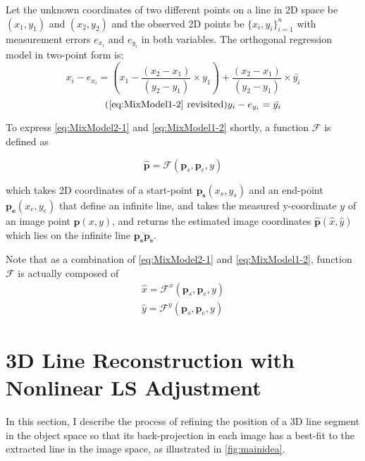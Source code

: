 Let the unknown coordinates of two different points on a line in 2D space be $(x_1,y_1)$ and $(x_2,y_2)$ and the observed 2D points be $\{x_i,y_i\}^n_{i=1}$ with measurement errors $e_{x_i}$ and $e_{y_i}$ in both variables. The orthogonal regression model in two-point form is: 
\begin{equation} \label{eq:MixModel2-1}
x_i - e_{x_i}= (x_1-\dfrac{(x_2-x_1)}{(y_2-y_1)}\times y_1) + \dfrac{(x_2-x_1)}{(y_2-y_1)}\times \bar{y_i}
\end{equation}
\begin{equation} \tag{\ref{eq:MixModel1-2} revisited}
y_i-e_{y_i} = \bar{y_i}
\end{equation}

To express \eqref{eq:MixModel2-1} and \eqref{eq:MixModel1-2} shortly, a function $\mathcal{F}$ is defined as

\begin{equation} \label{eq:Ffunction}
\hat{\mathbf{p}} = \mathcal{F}(\mathbf{p}_s,\mathbf{p}_e,y)
\end{equation}

which takes 2D coordinates of a start-point $\mathbf{p_s}(x_s,y_s)$ and an end-point $\mathbf{p_e}(x_e,y_e)$ that define an infinite line, and takes the measured y-coordinate $y$ of an image point $\mathbf{p}(x,y)$, and returns the estimated image coordinates $\mathbf{\hat{p}}(\hat{x},\hat{y})$ which lies on the infinite line $\overline{\mathbf{p_s}\mathbf{p_s}}$.

Note that as a combination of \eqref{eq:MixModel2-1} and \eqref{eq:MixModel1-2}, function $\mathcal{F}$ is actually composed of
\begin{equation} \label{eq:Ffunction_xy}
\begin{split}
\hat{x} = \mathcal{F}^x(\mathbf{p}_s,\mathbf{p}_e,y)\\
\hat{y} = \mathcal{F}^y(\mathbf{p}_s,\mathbf{p}_e,y)
\end{split}
\end{equation}

\clearpage
\section{3D Line Reconstruction with Nonlinear LS Adjustment}
\label{sec:LSadj}

In this section, I describe the process of refining the position of a 3D line segment in the object space so that its back-projection in each image has a best-fit to the extracted line in the image space, as illustrated in \cref{fig:mainidea}.

